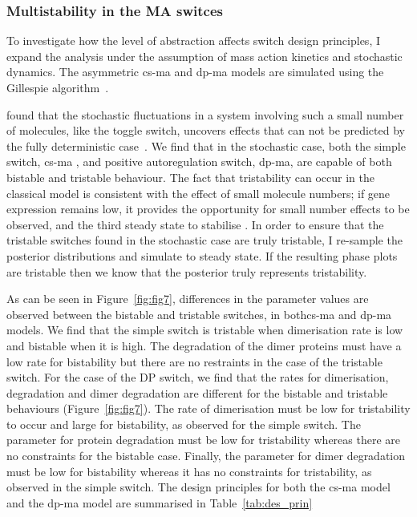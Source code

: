\subsubsection{Multistability in the MA switces}

To investigate how the level of abstraction affects switch design principles, I expand the analysis under the assumption of mass action kinetics and stochastic dynamics. The asymmetric \acrshort{cs-ma} and \acrshort{dp-ma} models are simulated using the Gillespie algorithm~\autocite{Gillespie:1977ww}.

\textcite{Ma:2012dt} found that the stochastic fluctuations in a system involving such a small number of molecules, like the toggle switch, uncovers effects that can not be predicted by the fully deterministic case~\autocite{Ma:2012dt}. We find that in the stochastic case, both the simple switch, \acrshort{cs-ma} , and positive autoregulation switch, \acrshort{dp-ma}, are capable of both bistable and tristable behaviour. The fact that tristability can occur in the classical model is consistent with the effect of small molecule numbers; if gene expression remains low, it provides the opportunity for small number effects to be observed, and the third steady state to stabilise \autocite{Ma:2012dt}. In order to ensure that the tristable switches found in the stochastic case are truly tristable, I re-sample the posterior distributions and simulate to steady state. If the resulting phase plots are tristable then we know that the posterior truly represents tristability. 

As can be seen in Figure~\ref{fig:fig7}, differences in the parameter values are observed between the bistable and tristable switches, in both\acrshort{cs-ma} and \acrshort{dp-ma} models. We find that the simple switch is tristable when dimerisation rate is low and bistable when it is high. The degradation of the dimer proteins must have a low rate for bistability but there are no restraints in the case of the tristable switch. For the case of the DP switch, we find that the rates for dimerisation, degradation and dimer degradation are different for the bistable and tristable behaviours (Figure~\ref{fig:fig7}). The rate of dimerisation must be low for tristability to occur and large for bistability, as observed for the simple switch. The parameter for protein degradation must be low for tristability whereas there are no constraints for the bistable case. Finally, the parameter for dimer degradation must be low for bistability whereas it has no constraints for tristability, as observed in the simple switch. The design principles for both the \acrshort{cs-ma} model and the \acrshort{dp-ma} model are summarised in Table~\ref{tab:des_prin}

